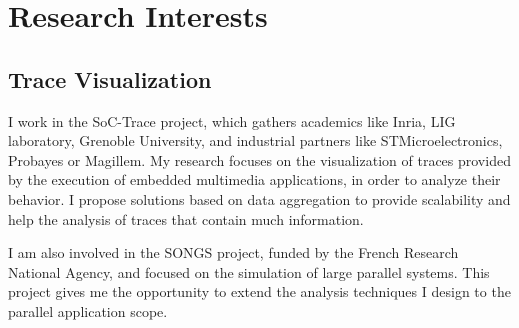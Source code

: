 \section{Research Interests}

\subsection{Trace Visualization}

%
{I work in the SoC-Trace project, which gathers academics like Inria, LIG 
laboratory, Grenoble University, and industrial partners like 
STMicroelectronics, Probayes or 
Magillem. My research focuses on the visualization of traces provided by 
the execution of embedded multimedia applications, in order to analyze their 
behavior. I propose solutions based on data aggregation to provide scalability 
and help the analysis of traces that contain much information.}

%
{I am also involved in the SONGS project, funded by the French 
Research National Agency, and focused on the simulation of large parallel 
systems. This project gives me the opportunity to extend the analysis 
techniques I design to the parallel application scope.}